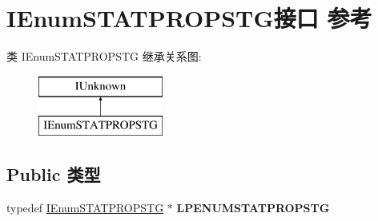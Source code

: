 \hypertarget{interface_i_enum_s_t_a_t_p_r_o_p_s_t_g}{}\section{I\+Enum\+S\+T\+A\+T\+P\+R\+O\+P\+S\+T\+G接口 参考}
\label{interface_i_enum_s_t_a_t_p_r_o_p_s_t_g}
类 I\+Enum\+S\+T\+A\+T\+P\+R\+O\+P\+S\+TG 继承关系图\+:\begin{figure}[H]
\begin{center}
\leavevmode
\includegraphics[height=2.000000cm]{interface_i_enum_s_t_a_t_p_r_o_p_s_t_g}
\end{center}
\end{figure}
\subsection*{Public 类型}
\begin{DoxyCompactItemize}
\item 
\mbox{\label{interface_i_enum_s_t_a_t_p_r_o_p_s_t_g_a3bc85074c512dff112d4aa247510a2ea}} 
typedef \hyperlink{interface_i_enum_s_t_a_t_p_r_o_p_s_t_g}{I\+Enum\+S\+T\+A\+T\+P\+R\+O\+P\+S\+TG} $\ast$ {\bfseries L\+P\+E\+N\+U\+M\+S\+T\+A\+T\+P\+R\+O\+P\+S\+TG}
\end{DoxyCompactItemize}
